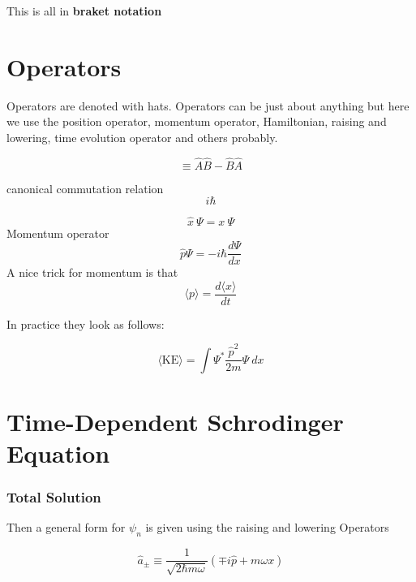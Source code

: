 This is all in \textbf{braket notation}

\section{Operators}
Operators are denoted with hats. Operators can be just about anything but here we use the position operator, momentum operator, Hamiltonian, raising and lowering, time evolution operator and others probably.

\begin{equation}
  [\hat{A},\hat{B}]\equiv \hat{A}\hat{B}-\hat{B}\hat{A}
\end{equation}

canonical commutation relation
\begin{equation}
  [x,\hat{p}]i\hbar 
\end{equation}

\begin{equation}
  \label{position-operator}
  \hat{x}~\Psi = x~\Psi
\end{equation}
Momentum operator
\begin{equation}
  \label{momentum-operator}
  \hat{p}\Psi = -i\hbar \frac{d\Psi}{dx}
\end{equation}
A nice trick for momentum is that
\begin{equation}
  \langle p\rangle = \frac{d\langle x\rangle}{dt}
\end{equation}





In practice they look as follows:

\begin{equation}
  \langle\text{KE}\rangle = \int\Psi^{*}\frac{\hat{p}^2}{2m}\Psi~dx
\end{equation}

\section{Time-Dependent Schrodinger Equation}

\subsubsection{Total Solution}
Then a general form for $ \psi_{n} $ is given using the raising and lowering Operators

\begin{equation}
  \hat{a}_{\pm}\equiv \frac{1}{\sqrt{2\hbar m\omega}}(\mp i\hat{p}+m\omega x)
\end{equation}

